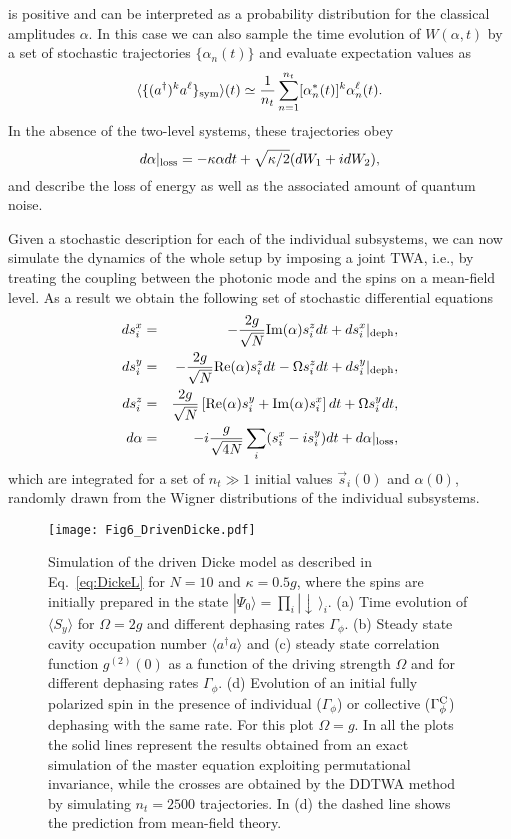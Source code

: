 \documentclass[pra,twocolumn,showpacs,preprintnumbers,amsmath,amssymb,superscriptaddress]{revtex4-1}
\newcommand{\erw}[1]{\langle#1\rangle}
\begin{document}
is positive and can be interpreted as a probability distribution for the classical amplitudes $\alpha$. In this case we can also sample the time evolution of $W(\alpha,t)$ by a set of stochastic trajectories   $\{\alpha_n(t)\}$ and evaluate expectation values as
\begin{equation}
\langle \{(a^\dag)^k a^\ell \}_{\rm sym}  \rangle (t) \simeq \frac{1}{n_t}\sum_{n=1}^{n_t} [\alpha_n^*(t)]^k  \alpha_n^\ell(t).
\end{equation}
In the absence of the two-level systems, these trajectories obey~\cite{GardinerZoller,WallsMilburn}
\begin{equation}
d\alpha |_{\rm loss}=-\kappa \alpha dt+\sqrt{\kappa/2} (dW_1 +i dW_2),
\end{equation}
and describe the loss of energy as well as the associated amount of quantum noise. 

Given a stochastic description for each of the individual subsystems, we can now simulate the dynamics of the whole setup by imposing a joint TWA, i.e., by treating the coupling between the photonic mode and the spins on a mean-field level. As a result we obtain the following set of stochastic differential equations
\begin{eqnarray}
ds_i^x&=& -\frac{2g}{\sqrt{N}} {\rm Im}(\alpha) s_i^z dt +ds_i^x|_{\rm deph},\\
ds_i^y&=&- \frac{2g}{\sqrt{N}} {\rm Re}(\alpha) s_i^z dt -\Omega s_i^z dt+ds_i^y|_{\rm deph},\\
ds_i^z&=& \frac{2g}{\sqrt{N}} \left[ {\rm Re}(\alpha) s_i^y+ {\rm Im}(\alpha) s_i^x \right]dt+ \Omega s_i^y dt,\\
d\alpha&=&-i  \frac{g}{\sqrt{4N}} \sum_i (s_i^x-i s_i^y) dt +d\alpha|_{\rm loss},
\end{eqnarray}
which are integrated for a set of  $n_t\gg1$ initial values $\vec s_i(0)$ and $\alpha(0)$, randomly drawn from the Wigner distributions of the individual subsystems.  


\begin{figure}[t]
	\centering
	\texttt{[image: Fig6\_DrivenDicke.pdf]}
	\caption{Simulation of the driven Dicke model as described in Eq.~\eqref{eq:DickeL} for $N=10$ and $\kappa=0.5g$, where the spins are initially prepared in the state $|\Psi_0\rangle=\prod_i |\downarrow\,\rangle_i$. 
		(a) Time evolution of $\erw{S_y}$ for $\Omega=2g$ and different dephasing rates $\Gamma_{\phi}$.
		(b) Steady state cavity occupation number $\langle a^\dag a\rangle$  and (c) steady state correlation function $g^{(2)}(0)$ as a function of the driving strength $\Omega$ and for different dephasing rates $\Gamma_{\phi}$.
		(d) Evolution of an initial fully polarized spin in the presence of individual ($\Gamma_\phi$) or collective ($\Gamma_\phi^{\rm C}$) dephasing with the same rate.  For this plot $\Omega=g$. In all the plots the solid lines represent the results obtained from an exact simulation of the master equation exploiting permutational invariance, while the crosses are obtained by the DDTWA method by simulating $n_t=2500$ trajectories. In (d) the dashed line shows the prediction from mean-field theory. }
	\label{fig:Dicke}
\end{figure}
\end{document}
